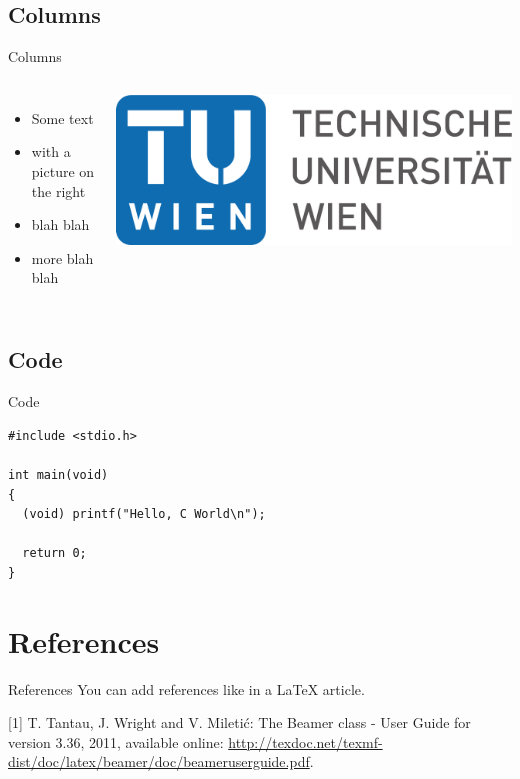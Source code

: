 \documentclass{beamer}
\begin{document}
\subsection{Columns}
\begin{frame}{Columns}
  \begin{columns}[c]
    \begin{itemize}
    \item Some text
    \item with a picture on the right
    \item blah blah
    \item more blah blah
    \end{itemize}
    \includegraphics[width=.8\textwidth]{TU_Logo}
  \end{columns}
\end{frame}

\subsection{Code}
\begin{frame}[fragile=singleslide]{Code}
   \begin{lstlisting}[basicstyle=\ttfamily]
#include <stdio.h>

int main(void)
{
  (void) printf("Hello, C World\n");

  return 0;
}
   \end{lstlisting}
\end{frame}

\section{References}
\begin{frame}{References}
  You can add references like in a LaTeX article.

  \begin{thebibliography}{10}
  [1] T. Tantau, J. Wright and V. Miletić: The Beamer
    class - User Guide for version 3.36, 2011, available online:
    \url{http://texdoc.net/texmf-dist/doc/latex/beamer/doc/beameruserguide.pdf}.
  \end{thebibliography}
\end{frame}
\end{document}
